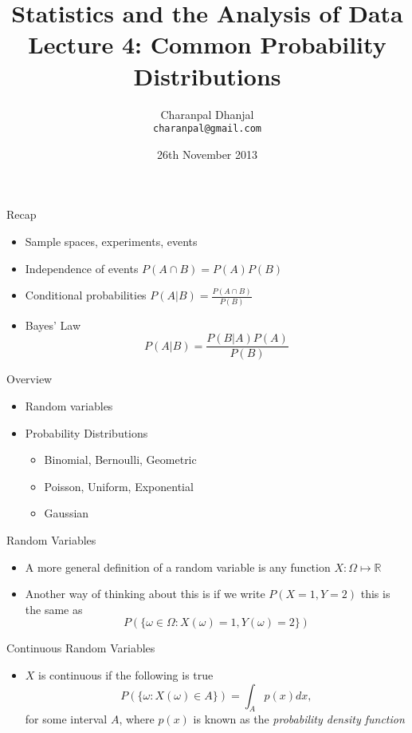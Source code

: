 \documentclass{beamer}
\title{Statistics and the Analysis of Data\\ Lecture 4: Common Probability Distributions}
\author{Charanpal Dhanjal \\ \texttt{charanpal@gmail.com}}
\institute{\'{E}cole des Ponts}
\date{26th November 2013}
\begin{document}
\frame{\titlepage}


\begin{frame}{Recap}  
\begin{itemize} 
\item Sample spaces, experiments, events 
\item Independence of events   $P(A \cap B) = P(A)P(B)$
\item Conditional probabilities  $P(A | B) = \frac{P(A \cap B)}{P(B)}$
\item Bayes' Law 
\begin{displaymath}
 P(A | B) = \frac{P(B | A)P(A)}{P(B)}
\end{displaymath}
\end{itemize}
\end{frame}

\begin{frame}{Overview}
\begin{itemize} 
\item Random variables 
\item Probability Distributions
\begin{itemize}
\item Binomial, Bernoulli, Geometric 
\item Poisson, Uniform, Exponential 
\item Gaussian  
\end{itemize}  
\end{itemize}
\end{frame}

\begin{frame}{Random Variables} 
\begin{itemize} 
 \item A more general definition of a random variable is any function $X: \Omega \mapsto \mathbb{R}$ 
 \item Another way of thinking about this is if we write $P(X=1, Y=2)$ this is the same as 
 \begin{displaymath}
  P(\{\omega \in \Omega: X(\omega) = 1, Y(\omega) = 2\}) 
 \end{displaymath}
 \end{itemize}
\end{frame}


\begin{frame}{Continuous Random Variables} 
\begin{itemize} 
 \item $X$ is continuous if the following is true 
\begin{displaymath} 
P(\{\omega: X(\omega) \in A\}) = \int_{A} p(x) dx, 
\end{displaymath}
for some interval $A$, where $p(x)$ is known as the \emph{probability density function} 
\end{itemize}
\end{frame}
\end{document}
